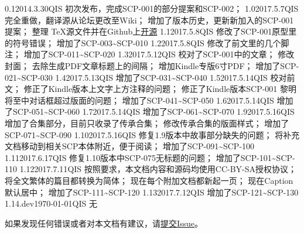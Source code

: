 


\begin{versionhistory}
\vhEntry
{0.1}{2014.3.30}{QIS}{
	初次发布，完成SCP-001的部分提案和SCP-002；
}
\vhEntry
{1.0}{2017.5.7}{QIS}{
	完全重做，翻译源从论坛更改至Wiki；
	增加了版本历史，更新新加入的SCP-001提案；
	整理 \TeX 源文件并在Github上\href{https://github.com/7sDream/scp-pdf}{开源}
}
\vhEntry
{1.1}{2017.5.8}{QIS}{
	修改了SCP-001原型里的符号错误；
	增加了SCP-003\textasciitilde SCP-010
}
\vhEntry
{1.2}{2017.5.8}{QIS}{
	修改了前文里的几个脚注；
	增加了SCP-011\textasciitilde SCP-020
}
\vhEntry
{1.3}{2017.5.12}{QIS}{
	校对了SCP-001中的文章；
	修改封面；
	去除生成PDF文章标题上的间隔；
	增加Kindle专版6寸PDF；
	增加了SCP-021\textasciitilde SCP-030
}
\vhEntry
{1.4}{2017.5.13}{QIS}{
    增加了SCP-031\textasciitilde SCP-040
}
\vhEntry
{1.5}{2017.5.14}{QIS}{
    校对前文；
    修正了Kindle版本上文字上方注释的问题；
    修正了Kindle版本SCP-001 黎明将至中对话框超过版面的问题；
    增加了SCP-041\textasciitilde SCP-050
}
\vhEntry
{1.6}{2017.5.14}{QIS}{
    增加了SCP-051\textasciitilde SCP-060
}
\vhEntry
{1.7}{2017.5.14}{QIS}{
    增加了SCP-061\textasciitilde SCP-070
}
\vhEntry
{1.9}{2017.5.16}{QIS}{
    增加了合集部分，目前只收录了传承合集；
    修改传承合集的版面样式；
    增加了SCP-071\textasciitilde SCP-090
}
\vhEntry
{1.10}{2017.5.16}{QIS}{
    修复1.9版本中故事部分缺失的问题；
    将补充文档移动到相关SCP本体附近，便于阅读；
    增加了SCP-091\textasciitilde SCP-100
}
\vhEntry
{1.11}{2017.6.17}{QIS}{
    修复1.10版本中SCP-075无标题的问题；
    增加了SCP-101\textasciitilde SCP-110
}
\vhEntry
{1.12}{2017.7.11}{QIS}{
    按照要求，本文档内容和源码均使用CC-BY-SA授权协议；
    将全文繁体的篇目都转换为简体；
    现在每个附加文档都新起一页；
    现在Caption默认居中；
    增加了SCP-111\textasciitilde SCP-120
}
\vhEntry
{1.13}{2017.7.12}{QIS}{
    增加了SCP-121\textasciitilde SCP-130
}
\vhEntry
{1.14.dev}{\today}{QIS}{
    无
}
\end{versionhistory}

如果发现任何错误或者对本文档有建议，请\href{https://github.com/7sDream/scp-pdf/issues}{提交Issue}。
